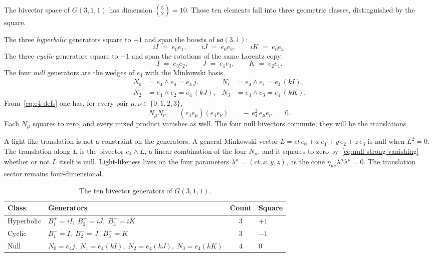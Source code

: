 \documentclass[a4paper]{article}
\begin{document}
The bivector space of \(G(3,1,1)\) has dimension \(\binom{5}{2}=10\). Those ten elements fall into three geometric classes, distinguished by the square.

The three \emph{hyperbolic} generators square to \(+1\) and span the boosts of \(\mathfrak{so}(3,1)\):
\[
iI \;=\; e_{0}e_{1},\qquad iJ \;=\; e_{0}e_{2},\qquad iK \;=\; e_{0}e_{3}.
\]
The three \emph{cyclic} generators square to \(-1\) and span the rotations of the same Lorentz copy:
\[
I \;=\; e_{3}e_{2},\qquad J \;=\; e_{1}e_{3},\qquad K \;=\; e_{2}e_{1}.
\]
The four \emph{null} generators are the wedges of \(e_{4}\) with the Minkowski basis,
\begin{align*}
N_{0} &= e_{4}\wedge e_{0} = e_{4}\,j, &
N_{1} &= e_{4}\wedge e_{1} = e_{4}\,(kI),\\
N_{2} &= e_{4}\wedge e_{2} = e_{4}\,(kJ), &
N_{3} &= e_{4}\wedge e_{3} = e_{4}\,(kK).
\end{align*}
From~\eqref{eq:e4-defs} one has, for every pair \(\mu,\nu\in\{0,1,2,3\}\),
\begin{equation}
N_{\mu}N_{\nu} \;=\; (e_{4}e_{\mu})(e_{4}e_{\nu}) \;=\; -\,e_{4}^{2}\,e_{\mu}e_{\nu} \;=\; 0.
\label{eq:null-strong-vanishing}
\end{equation}
Each \(N_{\mu}\) squares to zero, and every mixed product vanishes as well. The four null bivectors commute; they will be the translations.

A light-like translation is not a constraint on the generators. A general Minkowski vector \(L=ct\,e_{0}+x\,e_{1}+y\,e_{2}+z\,e_{3}\) is null when \(L^{2}=0\). The translation along \(L\) is the bivector \(e_{4}\wedge L\), a linear combination of the four \(N_{\mu}\), and it squares to zero by~\eqref{eq:null-strong-vanishing} whether or not \(L\) itself is null. Light-likeness lives on the four parameters \(\lambda^{\mu}=(ct,x,y,z)\), as the cone \(\eta_{\mu\nu}\lambda^{\mu}\lambda^{\nu}=0\). The translation sector remains four-dimensional.

\begin{table}[htbp]
\centering
\caption{The ten bivector generators of \(G(3,1,1)\).}
\label{tab:generators}
\begin{tabular}{llcl}
\hline
Class      & Generators & Count & Square \\
\hline
Hyperbolic & \(B_{1}^{+}=iI,\; B_{2}^{+}=iJ,\; B_{3}^{+}=iK\) & 3 & \(+1\) \\
Cyclic     & \(B_{1}^{-}=I,\; B_{2}^{-}=J,\; B_{3}^{-}=K\)     & 3 & \(-1\) \\
Null       & \(N_{0}=e_{4}j,\; N_{1}=e_{4}(kI),\; N_{2}=e_{4}(kJ),\; N_{3}=e_{4}(kK)\) & 4 & \(0\) \\
\hline
\end{tabular}
\end{table}
\end{document}
